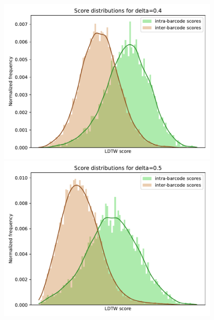 \begin{figure}[!ht]
\includegraphics[scale=0.5]{images/delta/delta_raw_40.pdf}
\includegraphics[scale=0.5]{images/delta/delta_raw_50.pdf}


\end{figure}
